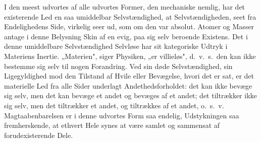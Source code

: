 \documentclass[12pt]{book}
\begin{document}
I den meest udvortes af alle udvortes Former, den mechaniske nemlig, har det existerende
Led en saa umiddelbar Selvstændighed, at Selvstændigheden, seet fra Endelighedens Side,
virkelig seer ud, som om den var absolut. Atomer og Masser antage i denne Belysning Skin
af en evig, paa sig selv beroende Existens. Det i denne umiddelbare Selvstændighed
Selvløse har sit kategoriske Udtryk i Materiens Inertie. „Materien", siger Physiken, „er
villieløs", d.\ v.\ s.\ den kan ikke bestemme sig selv til nogen Forandring. Ved sin døde
Selvstændighed, sin Ligegyldighed mod den Tilstand af Hvile eller Bevægelse, hvori det er
sat, er det materielle Led fra alle Sider underlagt Andethedsforholdet: det kan ikke
bevæge sig selv, men det kan bevæge et andet og bevæges af et andet; det tiltrækker ikke
sig selv, men det tiltrækker et andet, og tiltrækkes af et andet, o.\ s.\ v.
Magtaabenbarelsen er i denne udvortes Form saa endelig, Udstykningen saa fremherskende,
at ethvert Hele synes at være samlet og sammensat af forudexisterende Dele.
\end{document}
